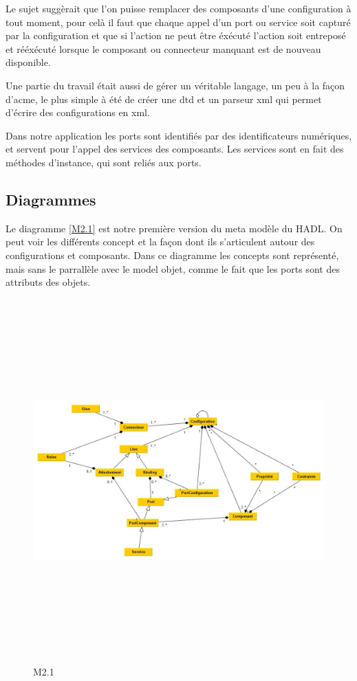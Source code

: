 \documentclass[11pt,a4paper]{article}
\begin{document}
Le sujet suggèrait que l'on puisse remplacer des composants d'une configuration à tout moment, pour celà il faut que chaque appel d'un port ou service soit capturé par la configuration et que si l'action ne peut être éxécuté l'action soit entreposé et rééxécuté lorsque le composant ou connecteur manquant est de nouveau disponible.

Une partie du travail était aussi de gérer un véritable langage, un peu à la façon d'acme, le plus simple à été de créer une dtd et un parseur xml qui permet d'écrire des configurations en xml. 

Dans notre application les ports sont identifiés par des identificateurs numériques, et servent pour l'appel des services des composants. Les services sont en fait des méthodes d'instance, qui sont reliés aux ports.

\subsection{Diagrammes}

Le diagramme \ref{M2.1} est notre première version du meta modèle du HADL. On peut voir les différents concept et la façon dont ils s'articulent autour des configurations et composants. Dans ce diagramme les concepts sont représenté, mais sans le parrallèle avec le model objet, comme le fait que les ports sont des attributs des objets.

\begin{figure}[h]
  		\centering
  		\includegraphics[height=14cm,width=15cm]{M2.jpg}
  		\caption{M2.1}
  		\label{Premier meta modèle}
\end{figure}
\end{document}
